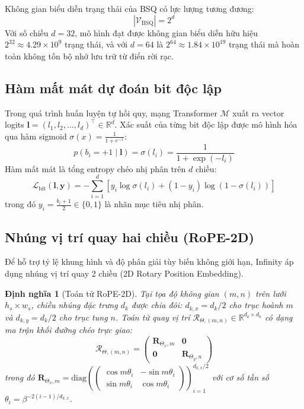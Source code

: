 \documentclass[10pt,twocolumn,letterpaper]{article}
\newtheorem{definition}{Định nghĩa}
\begin{document}
Không gian biểu diễn trạng thái của BSQ có lực lượng tương đương:
\begin{equation}
|\mathcal{V}_{\text{BSQ}}| = 2^d
\end{equation}
Với số chiều $d = 32$, mô hình đạt được không gian biểu diễn hữu hiệu $2^{32} \approx 4.29 \times 10^9$ trạng thái, và với $d=64$ là $2^{64} \approx 1.84 \times 10^{19}$ trạng thái mà hoàn toàn không tốn bộ nhớ lưu trữ từ điển rời rạc.

\subsection{Hàm mất mát dự đoán bit độc lập}
Trong quá trình huấn luyện tự hồi quy, mạng Transformer $\mathcal{M}$ xuất ra vector logits $\mathbf{l} = (l_1, l_2, \dots, l_d)^\top \in \mathbb{R}^d$. Xác suất của từng bit độc lập được mô hình hóa qua hàm sigmoid $\sigma(x) = \frac{1}{1 + e^{-x}}$:
\begin{equation}
p(b_i = +1 \mid \mathbf{l}) = \sigma(l_i) = \frac{1}{1 + \exp(-l_i)}
\end{equation}
Hàm mất mát là tổng entropy chéo nhị phân trên $d$ chiều:
\begin{equation}
\mathcal{L}_{\text{bit}}(\mathbf{l}, \mathbf{y}) = -\sum_{i=1}^{d} \left[ y_i \log \sigma(l_i) + (1 - y_i) \log (1 - \sigma(l_i)) \right]
\end{equation}
trong đó $y_i = \frac{b_i + 1}{2} \in \{0, 1\}$ là nhãn mục tiêu nhị phân.

\subsection{Nhúng vị trí quay hai chiều (RoPE-2D)}
Để hỗ trợ tỷ lệ khung hình và độ phân giải tùy biến không giới hạn, Infinity áp dụng nhúng vị trí quay 2 chiều (2D Rotary Position Embedding).

\begin{definition}[Toán tử RoPE-2D]
Tại tọa độ không gian $(m, n)$ trên lưới $h_s \times w_s$, chiều nhúng đặc trưng $d_k$ được chia đôi: $d_{k, x} = d_k / 2$ cho trục hoành $m$ và $d_{k, y} = d_k / 2$ cho trục tung $n$. Toán tử quay vị trí $\mathcal{R}_{\Theta, (m,n)} \in \mathbb{R}^{d_k \times d_k}$ có dạng ma trận khối đường chéo trực giao:
\begin{equation}
\mathcal{R}_{\Theta, (m,n)} = \begin{pmatrix}
\mathbf{R}_{\Theta_x, m} & \mathbf{0} \\
\mathbf{0} & \mathbf{R}_{\Theta_y, n}
\end{pmatrix}
\end{equation}
trong đó $\mathbf{R}_{\Theta_x, m} = \text{diag}\left( \begin{pmatrix} \cos m\theta_i & -\sin m\theta_i \\ \sin m\theta_i & \cos m\theta_i \end{pmatrix} \right)_{i=1}^{d_{k,x}/2}$ với cơ số tần số $\theta_i = \beta^{-2(i-1)/d_{k,x}}$.
\end{definition}
\end{document}

